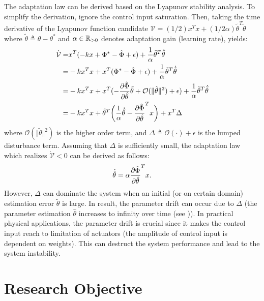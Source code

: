 The adaptation law can be derived based on the Lyapunov stability analysis.
To simplify the derivation, ignore the control input saturation.
Then, taking the time derivative of the Lyapunov function candidate $\mathcal V = (1/2)x^Tx+(1/2\alpha)\tilde\theta^T\tilde\theta$ where $\tilde\theta\triangleq \hat\theta-\theta^*$ and $\alpha\in\mathbb{R}_{>0}$ denotes adaptation gain (learning rate), yields:
\begin{equation}
    \begin{aligned}
        \dot{\mathcal V}
        =& x^T ( - kx + \Phi^* - \hat\Phi + \epsilon ) + {1\over\alpha}\tilde\theta^T \dot{\tilde\theta}
        \\
        =& - k x^Tx + x^T(\Phi^* - \hat\Phi + \epsilon) + {1\over\alpha}\tilde\theta^T \dot{\tilde\theta}
        \\
        =& - k x^Tx + x^T( -{\partial \hat\Phi\over\partial \hat\theta}\tilde\theta + \mathcal O(\Vert\tilde\theta\Vert^2) +\epsilon) + {1\over\alpha}\tilde\theta^T \dot{\tilde\theta}
        \\
        =& - k x^Tx +\tilde\theta^T
        \bigg(
            {1\over \alpha} \dot{\hat\theta} - {\partial \hat\Phi\over\partial \hat\theta}^T x
        \bigg)
        + x^T\Delta
    \end{aligned}
\end{equation}
where $\mathcal O (\Vert\tilde\theta\Vert^2)$ is the higher order term, and $\Delta\triangleq \mathcal O(\cdot)+\epsilon$ is the lumped disturbance term.
Assuming that $\Delta$ is sufficiently small, the adaptation law which realizes $\dot{\mathcal V}<0$ can be derived as follows:
\begin{equation}
    \dot{\hat\theta} = \alpha {\partial \hat\Phi\over\partial \hat\theta}^T x
    .
\end{equation}
However, $\Delta$ can dominate the system when an initial (or on certain domain) estimation error $\tilde\theta$ is large.
In result, the parameter drift can occur due to $\Delta$ (\ie the parameter estimation $\hat\theta$ increases to infinity over time (see \cite{RN6})).
In practical physical applications, the parameter drift is crucial since it makes the control input reach to limitation of actuators (\ie the amplitude of control input is dependent on weights).
This can destruct the system performance and lead to the system instability.

\section{Research Objective} \label{chap1:sec:research objective}

